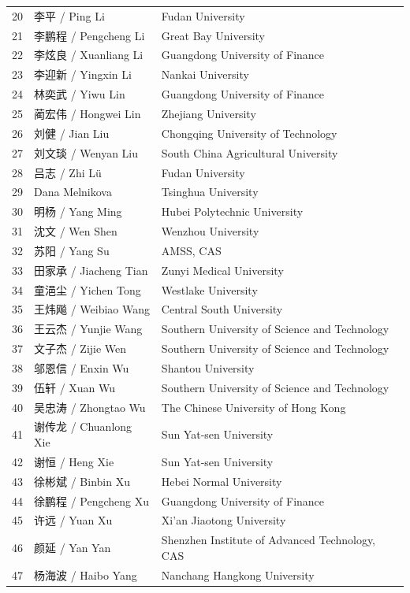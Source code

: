 \documentclass[12pt,a4paper,twoside,UTF8,fontset=none]{ctexart}
\begin{document}
\begin{longtable}{@{}C{0.9cm}L{5.0cm}L{8.8cm}@{}}
20 & 李平 / Ping Li & Fudan University\\
21 & 李鹏程 / Pengcheng Li & Great Bay University\\
22 & 李炫良 / Xuanliang Li & Guangdong University of Finance\\
23 & 李迎新 / Yingxin Li & Nankai University\\
24 & 林奕武 / Yiwu Lin & Guangdong University of Finance\\
25 & 蔺宏伟 / Hongwei Lin & Zhejiang University\\
26 & 刘健 / Jian Liu & Chongqing University of Technology\\
27 & 刘文琰 / Wenyan Liu & South China Agricultural University\\
28 & 吕志 / Zhi Lü & Fudan University\\
29 & Dana Melnikova & Tsinghua University\\
30 & 明杨 / Yang Ming & Hubei Polytechnic University\\
31 & 沈文 / Wen Shen & Wenzhou University\\
32 & 苏阳 / Yang Su & AMSS, CAS\\
33 & 田家承 / Jiacheng Tian & Zunyi Medical University\\
34 & 童浥尘 / Yichen Tong & Westlake University\\
35 & 王炜飚 / Weibiao Wang & Central South University\\
36 & 王云杰 / Yunjie Wang & Southern University of Science and Technology\\
37 & 文子杰 / Zijie Wen & Southern University of Science and Technology\\
38 & 邬恩信 / Enxin Wu & Shantou University\\
39 & 伍轩 / Xuan Wu & Southern University of Science and Technology\\
40 & 吴忠涛 / Zhongtao Wu & The Chinese University of Hong Kong\\
41 & 谢传龙 / Chuanlong Xie & Sun Yat-sen University\\
42 & 谢恒 / Heng Xie & Sun Yat-sen University\\
43 & 徐彬斌 / Binbin Xu & Hebei Normal University\\
44 & 徐鹏程 / Pengcheng Xu & Guangdong University of Finance\\
45 & 许远 / Yuan Xu & Xi'an Jiaotong University\\
46 & 颜延 / Yan Yan & Shenzhen Institute of Advanced Technology, CAS\\
47 & 杨海波 / Haibo Yang & Nanchang Hangkong University\\

\end{longtable}
\end{document}
